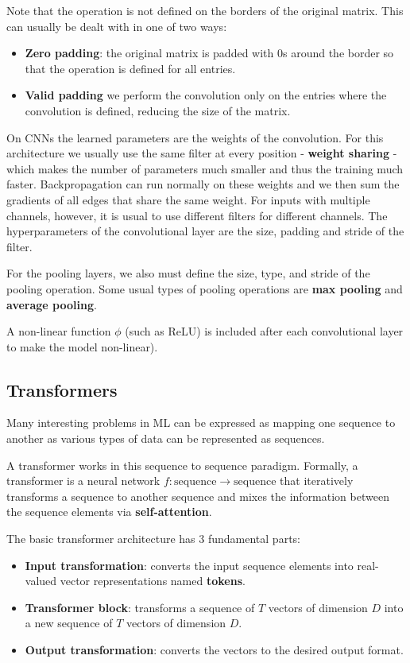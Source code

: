 \documentclass{article}
\begin{document}
Note that the operation is not defined on the borders of the original matrix.
This can usually be dealt with in one of two ways:
\begin{itemize}
    \item \textbf{Zero padding}: the original matrix is padded with 0s around the border so that the operation is defined for all entries.
    \item \textbf{Valid padding} we perform the convolution only on the entries where the convolution is defined, reducing the size of the matrix.
\end{itemize}

On CNNs the learned parameters are the weights of the convolution.
For this architecture we usually use the same filter at every position - \textbf{weight sharing} - which makes the number of parameters much smaller and thus the training much faster. 
Backpropagation can run normally on these weights and we then sum the gradients of all edges that share the same weight.
For inputs with multiple channels, however, it is usual to use different filters for different channels.
The hyperparameters of the convolutional layer are the size, padding and stride of the filter.

For the pooling layers, we also must define the size, type, and stride of the pooling operation.
Some usual types of pooling operations are \textbf{max pooling} and \textbf{average pooling}.

A non-linear function $\phi$ (such as ReLU) is included after each convolutional layer to make the model non-linear).

\subsection{Transformers}

Many interesting problems in ML can be expressed as mapping one sequence to another as various types of data can be represented as sequences.

A transformer works in this sequence to sequence paradigm.
Formally, a transformer is a neural network $f: \text{sequence} \to \text{sequence}$ that iteratively transforms a sequence to another sequence and mixes the information between the sequence elements via \textbf{self-attention}.

The basic transformer architecture has 3 fundamental parts:
\begin{itemize}
    \item \textbf{Input transformation}: converts the input sequence elements into real-valued vector representations named \textbf{tokens}.
    \item \textbf{Transformer block}: transforms a sequence of $T$ vectors of dimension $D$ into a new sequence of $T$ vectors of dimension $D$.
    \item \textbf{Output transformation}: converts the vectors to the desired output format.
\end{itemize}
\end{document}
